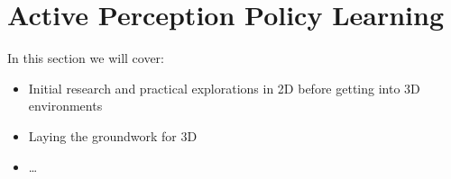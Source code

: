 \chapter{Active Perception Policy Learning}
In this section we will cover:
  \begin{itemize}
    \item Initial research and practical explorations in 2D before getting into 3D environments
    \item Laying the groundwork for 3D
    \item \ldots
  \end{itemize}



